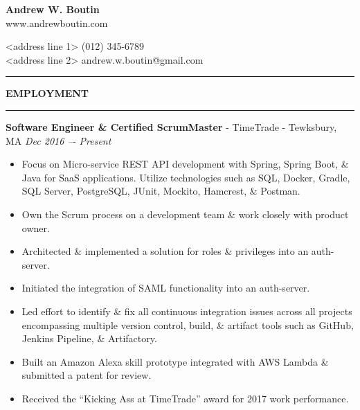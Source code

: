 \documentclass[letterpaper,10pt]{article}
\begin{document}

\thispagestyle{empty}

{\centering
  \textbf{{\fontsize{13}{15.6} \selectfont Andrew W. Boutin}}\\
  www.andrewboutin.com\par
}
\noindent
\textless address line 1\textgreater
\hfill
(012) 345-6789\\
\textless address line 2\textgreater
\hfill
andrew.w.boutin@gmail.com%
\vspace{3pt}
\hrule
\vspace{\baselineskip}

\noindent
\textbf{EMPLOYMENT}
\vspace{5pt}
\hrule
\vspace{3pt}
\noindent\textbf{Software Engineer \& Certified ScrumMaster} - TimeTrade - Tewksbury, MA
\hfill
\textit{Dec 2016 –- Present}
\begin{itemize}
\setlength
  \item Focus on Micro-service REST API development with Spring, Spring Boot, \& Java for SaaS applications. Utilize technologies such as SQL, Docker, Gradle, SQL Server, PostgreSQL, JUnit, Mockito, Hamcrest, \& Postman.
  \item Own the Scrum process on a development team \& work closely with product owner.
  \item Architected \& implemented a solution for roles \& privileges into an auth-server.
  \item Initiated the integration of SAML functionality into an auth-server.
  \item Led effort to identify \& fix all continuous integration issues across all projects encompassing multiple version control, build, \& artifact tools such as GitHub, Jenkins Pipeline, \& Artifactory.
  \item Built an Amazon Alexa skill prototype integrated with AWS Lambda \& submitted a patent for review.
  \item Received the “Kicking Ass at TimeTrade” award for 2017 work performance.
\end{itemize}
\vspace{\baselineskip}
\end{document}
